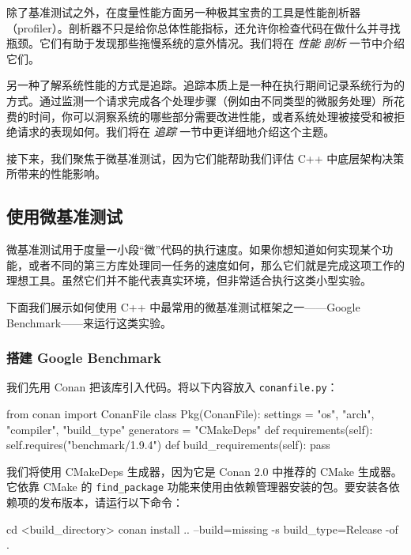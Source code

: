 除了基准测试之外，在度量性能方面另一种极其宝贵的工具是性能剖析器（profiler）。剖析器不只是给你总体性能指标，还允许你检查代码在做什么并寻找瓶颈。它们有助于发现那些拖慢系统的意外情况。我们将在 \emph{性能} \emph{剖析} 一节中介绍它们。

另一种了解系统性能的方式是追踪。追踪本质上是一种在执行期间记录系统行为的方式。通过监测一个请求完成各个处理步骤（例如由不同类型的微服务处理）所花费的时间，你可以洞察系统的哪些部分需要改进性能，或者系统处理被接受和被拒绝请求的表现如何。我们将在 \emph{追踪} 一节中更详细地介绍这个主题。

接下来，我们聚焦于微基准测试，因为它们能帮助我们评估 C++ 中底层架构决策所带来的性能影响。

\subsection{使用微基准测试}

\label{idx:1161}
微基准测试用于度量一小段“微”代码的执行速度。如果你想知道如何实现某个功能，或者不同的第三方库处理同一任务的速度如何，那么它们就是完成这项工作的理想工具。虽然它们并不能代表真实环境，但非常适合执行这类小型实验。

\label{idx:1162}
下面我们展示如何使用 C++ 中最常用的微基准测试框架之一——Google Benchmark——来运行这类实验。

\subsubsection{搭建 Google Benchmark}

\label{idx:1163}
我们先用 Conan 把该库引入代码。将以下内容放入 \texttt{conanfile.\allowbreak{}py}：

\begin{codebox}[python]
from conan import ConanFile
class Pkg(ConanFile):
    settings = "os", "arch", "compiler", "build_type"
    generators = "CMakeDeps"
    def requirements(self):
        self.requires("benchmark/1.9.4")
    def build_requirements(self):
        pass
\end{codebox}

我们将使用 CMakeDeps 生成器，因为它是 Conan 2.0 中推荐的 CMake 生成器。它依靠 CMake 的 \texttt{find\_\allowbreak{}package} 功能来使用由依赖管理器安装的包。要安装各依赖项的发布版本，请运行以下命令：

\begin{codebox}[text]
cd <build_directory>
conan install .. --build=missing -s build_type=Release -of .
\end{codebox}

